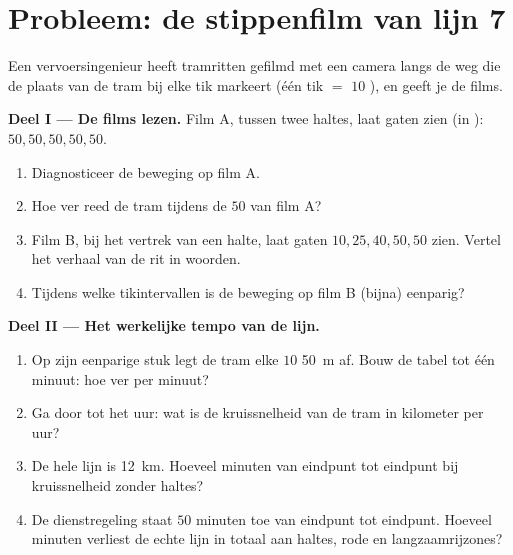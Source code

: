 \section{Probleem: de stippenfilm van lijn 7}

\begin{problem}\label{pb:g6:describing-motion:1}
Een vervoersingenieur heeft tramritten gefilmd met een camera langs de
weg die de plaats van de tram bij elke tik markeert (één tik $=$ $10$
), en geeft je de films.

\medskip\noindent\textbf{Deel I --- De films lezen.}
Film A, tussen twee haltes, laat gaten zien (in ):
$50, 50, 50, 50, 50$.
\begin{enumerate}
  \item Diagnosticeer de beweging op film A.
  \item Hoe ver reed de tram tijdens de $50$  van film A?
  \item Film B, bij het vertrek van een halte, laat gaten
        $10, 25, 40, 50, 50$ zien. Vertel het verhaal van de rit in
        woorden.
  \item Tijdens welke tikintervallen is de beweging op film B
        (bijna) eenparig?
\end{enumerate}

\medskip\noindent\textbf{Deel II --- Het werkelijke tempo van de lijn.}
\begin{enumerate}[resume]
  \item Op zijn eenparige stuk legt de tram elke $10$ 
        \qty{50}{m} af. Bouw de tabel tot één minuut: hoe ver per
        minuut?
  \item Ga door tot het uur: wat is de kruissnelheid van de tram in
        kilometer per uur?
  \item De hele lijn is \qty{12}{km}. Hoeveel minuten van eindpunt
        tot eindpunt bij kruissnelheid zonder haltes?
  \item De dienstregeling staat $50$ minuten toe van eindpunt tot
        eindpunt. Hoeveel minuten verliest de echte lijn in totaal
        aan haltes, rode  en langzaamrijzones?
\end{enumerate}


\end{problem}

